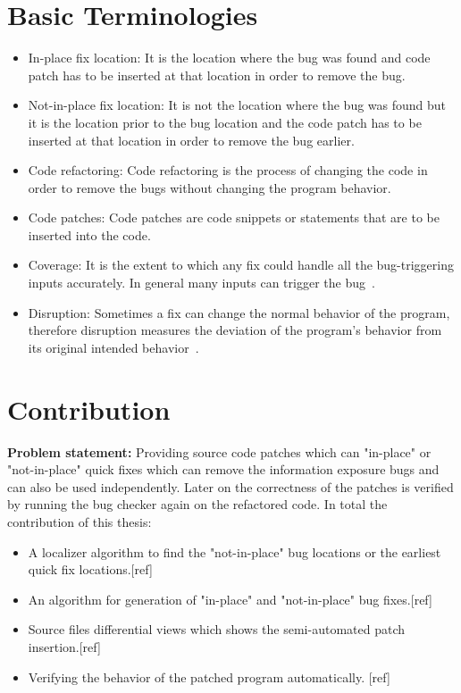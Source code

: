 \section{Basic Terminologies}
\begin{itemize}
 \item In-place fix location:
 It is the location where the bug was found and code patch has to be
 inserted at that location in order to remove the bug.
 \item Not-in-place fix location:
 It is not the location where the bug was found but it is the location 
 prior to the bug location and the code patch has to be inserted at that
 location in order to remove the bug earlier.
 \item Code refactoring:
 Code refactoring is the process of changing the code in order to remove
 the bugs without changing the program behavior.
 \item Code patches:
 Code patches are code snippets or statements that are to be inserted
 into the code.
 \item Coverage: It is the extent to which any fix could handle all the bug-triggering
 inputs accurately. In general many inputs can trigger the bug~\cite{Gu:fix}.
 
 \item Disruption:
 Sometimes a fix can change the normal behavior of the program, therefore disruption measures
 the deviation of the program's behavior from its original intended behavior~\cite{Gu:fix}.
 
\end{itemize}


\section{Contribution}
\textbf{Problem statement:} Providing source code patches which can "in-place" or "not-in-place" quick fixes
which can remove the information exposure bugs and can also be used independently. Later on the correctness of the patches
is verified by running the bug checker again on the refactored code.
In total the contribution of this thesis:
\begin{itemize}
\item A localizer algorithm to find the "not-in-place" bug locations or the earliest quick fix locations.[ref]
\item An algorithm for generation of "in-place" and "not-in-place" bug fixes.[ref]
\item Source files differential views which shows the semi-automated patch insertion.[ref]
\item Verifying the behavior of the patched program automatically. [ref]
\end{itemize}



